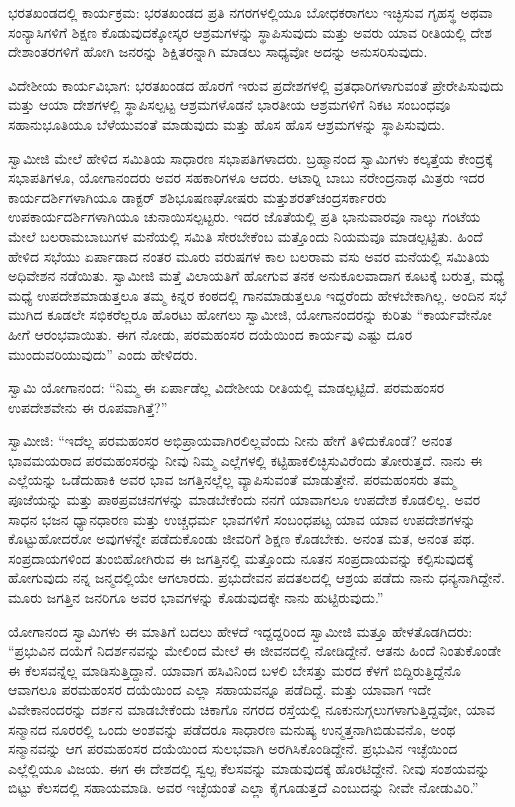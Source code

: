  ಭರತಖಂಡದಲ್ಲಿ ಕಾರ್ಯಕ್ರಮ: ಭರತಖಂಡದ ಪ್ರತಿ ನಗರಗಳಲ್ಲಿಯೂ ಬೋಧಕರಾಗಲು ಇಚ್ಛಿಸುವ ಗೃಹಸ್ಥ ಅಥವಾ ಸಂನ್ಯಾಸಿಗಳಿಗೆ ಶಿಕ್ಷಣ ಕೊಡುವುದಕ್ಕೋಸ್ಕರ ಆಶ್ರಮಗಳನ್ನು ಸ್ಥಾಪಿಸುವುದು ಮತ್ತು ಅವರು ಯಾವ ರೀತಿಯಲ್ಲಿ ದೇಶ ದೇಶಾಂತರಗಳಿಗೆ ಹೋಗಿ ಜನರನ್ನು ಶಿಕ್ಷಿತರನ್ನಾಗಿ ಮಾಡಲು ಸಾಧ್ಯವೋ ಅದನ್ನು ಅನುಸರಿಸುವುದು. 

 ವಿದೇಶೀಯ ಕಾರ್ಯವಿಭಾಗ: ಭರತಖಂಡದ ಹೊರಗೆ ಇರುವ ಪ್ರದೇಶಗಳಲ್ಲಿ ವ್ರತಧಾರಿಗಳಾಗುವಂತೆ ಪ್ರೇರೇಪಿಸುವುದು ಮತ್ತು ಆಯಾ ದೇಶಗಳಲ್ಲಿ ಸ್ಥಾಪಿಸಲ್ಪಟ್ಟ ಆಶ್ರಮಗಳೊಡನೆ ಭಾರತೀಯ ಆಶ್ರಮಗಳಿಗೆ ನಿಕಟ ಸಂಬಂಧವೂ ಸಹಾನುಭೂತಿಯೂ ಬೆಳೆಯುವಂತೆ ಮಾಡುವುದು ಮತ್ತು ಹೊಸ ಹೊಸ ಆಶ್ರಮಗಳನ್ನು ಸ್ಥಾಪಿಸುವುದು. 

 ಸ್ವಾಮೀಜಿ ಮೇಲೆ ಹೇಳಿದ ಸಮಿತಿಯ ಸಾಧಾರಣ ಸಭಾಪತಿಗಳಾದರು. ಬ್ರಹ್ಮಾನಂದ ಸ್ವಾಮಿಗಳು ಕಲ್ಕತ್ತೆಯ ಕೇಂದ್ರಕ್ಕೆ ಸಭಾಪತಿಗಳೂ, ಯೋಗಾನಂದರು ಅವರ ಸಹಕಾರಿಗಳೂ ಆದರು. ಆಟಾರ‍್ನಿ ಬಾಬು ನರೇಂದ್ರನಾಥ ಮಿತ್ರರು ಇದರ ಕಾರ್ಯದರ್ಶಿಗಳಾಗಿಯೂ ಡಾಕ್ಟರ್ ಶಶಿಭೂಷಣಘೋಷರು ಮತ್ತು\break ಶರತ್‍ಚಂದ್ರಸರ್ಕಾರರು ಉಪಕಾರ್ಯದರ್ಶಿಗಳಾಗಿಯೂ ಚುನಾಯಿಸಲ್ಪಟ್ಟರು. ಇದರ ಜೊತೆಯಲ್ಲಿ ಪ್ರತಿ ಭಾನುವಾರವೂ ನಾಲ್ಕು ಗಂಟೆಯ ಮೇಲೆ ಬಲರಾಮಬಾಬುಗಳ ಮನೆಯಲ್ಲಿ ಸಮಿತಿ ಸೇರಬೇಕೆಂಬ ಮತ್ತೊಂದು ನಿಯಮವೂ ಮಾಡಲ್ಪಟ್ಟಿತು. ಹಿಂದೆ ಹೇಳಿದ ಸಭೆಯು ಏರ್ಪಾಡಾದ ನಂತರ ಮೂರು ವರುಷಗಳ ಕಾಲ ಬಲರಾಮ ವಸು ಅವರ ಮನೆಯಲ್ಲಿ ಸಮಿತಿಯ ಅಧಿವೇಶನ ನಡೆಯಿತು. ಸ್ವಾಮೀಜಿ ಮತ್ತೆ ವಿಲಾಯತಿಗೆ ಹೋಗುವ ತನಕ ಅನುಕೂಲವಾದಾಗ ಕೂಟಕ್ಕೆ ಬರುತ್ತ, ಮಧ್ಯೆ ಮಧ್ಯೆ ಉಪದೇಶಮಾಡುತ್ತಲೂ ತಮ್ಮ ಕಿನ್ನರ ಕಂಠದಲ್ಲಿ ಗಾನಮಾಡುತ್ತಲೂ ಇದ್ದರೆಂದು ಹೇಳಬೇಕಾಗಿಲ್ಲ. ಅಂದಿನ ಸಭೆ ಮುಗಿದ ಕೂಡಲೇ ಸಭಿಕರೆಲ್ಲರೂ ಹೊರಟು ಹೋಗಲು ಸ್ವಾಮೀಜಿ, ಯೋಗಾನಂದರನ್ನು ಕುರಿತು “ಕಾರ್ಯವೇನೋ ಹೀಗೆ ಆರಂಭವಾಯಿತು. ಈಗ ನೋಡು, ಪರಮಹಂಸರ ದಯೆಯಿಂದ ಕಾರ್ಯವು ಎಷ್ಟು ದೂರ ಮುಂದುವರಿಯುವುದು” ಎಂದು ಹೇಳಿದರು. 

 ಸ್ವಾಮಿ ಯೋಗಾನಂದ: “ನಿಮ್ಮ ಈ ಏರ್ಪಾಡೆಲ್ಲ ವಿದೇಶೀಯ ರೀತಿಯಲ್ಲಿ ಮಾಡಲ್ಪಟ್ಟಿದೆ. ಪರಮಹಂಸರ ಉಪದೇಶವೇನು ಈ ರೂಪವಾಗಿತ್ತೆ?” 

 ಸ್ವಾಮೀಜಿ: “ಇದೆಲ್ಲ ಪರಮಹಂಸರ ಅಭಿಪ್ರಾಯವಾಗಿರಲಿಲ್ಲವೆಂದು ನೀನು ಹೇಗೆ ತಿಳಿದುಕೊಂಡೆ? ಅನಂತ ಭಾವಮಯರಾದ ಪರಮಹಂಸರನ್ನು ನೀವು ನಿಮ್ಮ ಎಲ್ಲೆಗಳಲ್ಲಿ ಕಟ್ಟಿಹಾಕಲಿಚ್ಛಿಸುವಿರೆಂದು ತೋರುತ್ತದೆ. ನಾನು ಈ ಎಲ್ಲೆಯನ್ನು ಒಡೆದುಹಾಕಿ ಅವರ ಭಾವ ಜಗತ್ತಿನಲ್ಲೆಲ್ಲ ವ್ಯಾಪಿಸುವಂತೆ ಮಾಡುತ್ತೇನೆ. ಪರಮಹಂಸರು ತಮ್ಮ ಪೂಜೆಯನ್ನು ಮತ್ತು ಪಾಠಪ್ರವಚನಗಳನ್ನು ಮಾಡಬೇಕೆಂದು ನನಗೆ ಯಾವಾಗಲೂ ಉಪದೇಶ ಕೊಡಲಿಲ್ಲ. ಅವರ ಸಾಧನ ಭಜನ ಧ್ಯಾನಧಾರಣ ಮತ್ತು ಉಚ್ಚಧರ್ಮ ಭಾವಗಳಿಗೆ ಸಂಬಂಧಪಟ್ಟ ಯಾವ ಯಾವ ಉಪದೇಶಗಳನ್ನು ಕೊಟ್ಟುಹೋದರೋ ಅವುಗಳನ್ನೇ ಪಡೆದುಕೊಂಡು ಜೀವರಿಗೆ ಶಿಕ್ಷಣ ಕೊಡಬೇಕು. ಅನಂತ ಮತ, ಅನಂತ ಪಥ. ಸಂಪ್ರದಾಯಗಳಿಂದ ತುಂಬಿಹೋಗಿರುವ ಈ ಜಗತ್ತಿನಲ್ಲಿ ಮತ್ತೊಂದು ನೂತನ ಸಂಪ್ರದಾಯವನ್ನು ಕಲ್ಪಿಸುವುದಕ್ಕೆ ಹೋಗುವುದು ನನ್ನ ಜನ್ಮದಲ್ಲಿಯೇ ಆಗಲಾರದು. ಪ್ರಭುದೇವನ ಪದತಲದಲ್ಲಿ ಆಶ್ರಯ ಪಡೆದು ನಾನು ಧನ್ಯನಾಗಿದ್ದೇನೆ. ಮೂರು ಜಗತ್ತಿನ ಜನರಿಗೂ ಅವರ ಭಾವಗಳನ್ನು ಕೊಡುವುದಕ್ಕೇ ನಾನು ಹುಟ್ಟಿರುವುದು.” 

 ಯೋಗಾನಂದ ಸ್ವಾಮಿಗಳು ಈ ಮಾತಿಗೆ ಬದಲು ಹೇಳದೆ ಇದ್ದದ್ದರಿಂದ ಸ್ವಾಮೀಜಿ ಮತ್ತೂ ಹೇಳತೊಡಗಿದರು: “ಪ್ರಭುವಿನ ದಯೆಗೆ ನಿದರ್ಶನವನ್ನು ಮೇಲಿಂದ ಮೇಲೆ ಈ ಜೀವನದಲ್ಲಿ ನೋಡಿದ್ದೇನೆ. ಆತನು ಹಿಂದೆ ನಿಂತುಕೊಂಡೇ ಈ ಕೆಲಸವನ್ನೆಲ್ಲ ಮಾಡಿಸುತ್ತಿದ್ದಾನೆ. ಯಾವಾಗ ಹಸಿವಿನಿಂದ ಬಳಲಿ ಬೇಸತ್ತು ಮರದ ಕೆಳಗೆ ಬಿದ್ದಿರುತ್ತಿದ್ದೆನೊ ಆವಾಗಲೂ ಪರಮಹಂಸರ ದಯೆಯಿಂದ ಎಲ್ಲಾ ಸಹಾಯವನ್ನೂ ಪಡೆದಿದ್ದೆ. ಮತ್ತು ಯಾವಾಗ ಇದೇ ವಿವೇಕಾನಂದರನ್ನು ದರ್ಶನ ಮಾಡಬೇಕೆಂದು ಚಿಕಾಗೊ ನಗರದ ರಸ್ತೆಯಲ್ಲಿ ನೂಕುನುಗ್ಗಲುಗಳಾಗುತ್ತಿದ್ದವೋ, ಯಾವ ಸನ್ಮಾನದ ನೂರರಲ್ಲಿ ಒಂದು ಅಂಶವನ್ನು ಪಡೆದರೂ ಸಾಧಾರಣ ಮನುಷ್ಯ ಉನ್ಮತ್ತನಾಗಿಬಿಡುವನೊ, ಅಂಥ ಸನ್ಮಾನವನ್ನು ಆಗ ಪರಮಹಂಸರ ದಯೆಯಿಂದ ಸುಲಭವಾಗಿ ಅರಗಿಸಿಕೊಂಡಿದ್ದೇನೆ. ಪ್ರಭುವಿನ ಇಚ್ಛೆಯಿಂದ ಎಲ್ಲೆಲ್ಲಿಯೂ ವಿಜಯ. ಈಗ ಈ ದೇಶದಲ್ಲಿ ಸ್ವಲ್ಪ ಕೆಲಸವನ್ನು ಮಾಡುವುದಕ್ಕೆ ಹೊರಟಿದ್ದೇನೆ. ನೀವು ಸಂಶಯವನ್ನು ಬಿಟ್ಟು ಕೆಲಸದಲ್ಲಿ ಸಹಾಯಮಾಡಿ. ಅವರ ಇಚ್ಛೆಯಂತೆ ಎಲ್ಲಾ ಕೈಗೂಡುತ್ತದೆ ಎಂಬುದನ್ನು ನೀವೇ ನೋಡುವಿರಿ.” 


